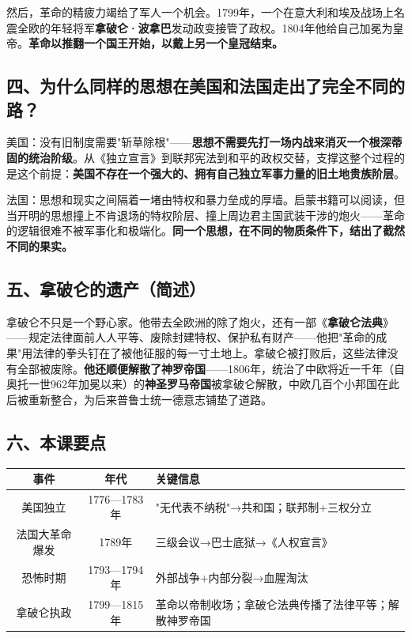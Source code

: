 \documentclass[a4paper,12pt]{ctexart}
\begin{document}
然后，革命的精疲力竭给了军人一个机会。1799年，一个在意大利和埃及战场上名震全欧的年轻将军\textbf{拿破仑·波拿巴}发动政变接管了政权。1804年他给自己加冕为皇帝。\textbf{革命以推翻一个国王开始，以戴上另一个皇冠结束。}

\subsection*{四、为什么同样的思想在美国和法国走出了完全不同的路？}

美国：没有旧制度需要"斩草除根"——\textbf{思想不需要先打一场内战来消灭一个根深蒂固的统治阶级}。从《独立宣言》到联邦宪法到和平的政权交替，支撑这整个过程的是这个前提：\textbf{美国不存在一个强大的、拥有自己独立军事力量的旧土地贵族阶层}。

法国：思想和现实之间隔着一堵由特权和暴力垒成的厚墙。启蒙书籍可以阅读，但当开明的思想撞上不肯退场的特权阶层、撞上周边君主国武装干涉的炮火——革命的逻辑很难不被军事化和极端化。\textbf{同一个思想，在不同的物质条件下，结出了截然不同的果实。}

\subsection*{五、拿破仑的遗产（简述）}

拿破仑不只是一个野心家。他带去全欧洲的除了炮火，还有一部《\textbf{拿破仑法典}》——规定法律面前人人平等、废除封建特权、保护私有财产——他把"革命的成果"用法律的拳头钉在了被他征服的每一寸土地上。拿破仑被打败后，这些法律没有全部被废除。\textbf{他还顺便解散了神罗帝国}——1806年，统治了中欧将近一千年（自奥托一世962年加冕以来）的\textbf{神圣罗马帝国}被拿破仑解散，中欧几百个小邦国在此后被重新整合，为后来普鲁士统一德意志铺垫了道路。

\subsection*{六、本课要点}

\begin{center}
\begin{tabular}{|c|c|p{7cm}|}
\hline
\textbf{事件} & \textbf{年代} & \textbf{关键信息} \\
\hline
美国独立 & 1776—1783年 & "无代表不纳税"→共和国；联邦制+三权分立 \\
\hline
法国大革命爆发 & 1789年 & 三级会议→巴士底狱→《人权宣言》 \\
\hline
恐怖时期 & 1793—1794年 & 外部战争+内部分裂→血腥淘汰 \\
\hline
拿破仑执政 & 1799—1815年 & 革命以帝制收场；拿破仑法典传播了法律平等；解散神罗帝国 \\
\hline
\end{tabular}
\end{center}
\end{document}
